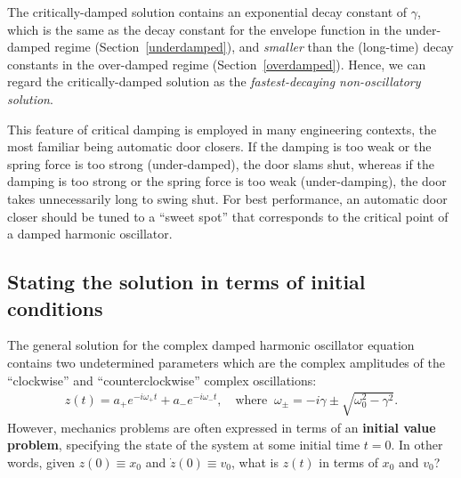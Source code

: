 \documentclass[10pt,a4paper]{article}
\begin{document}
The critically-damped solution contains an exponential decay constant
of $\gamma$, which is the same as the decay constant for the envelope
function in the under-damped regime (Section~\ref{underdamped}), and
\textit{smaller} than the (long-time) decay constants in the
over-damped regime (Section~\ref{overdamped}).  Hence, we can regard
the critically-damped solution as the \textit{fastest-decaying
  non-oscillatory solution}.

This feature of critical damping is employed in many engineering
contexts, the most familiar being automatic door closers. If the
damping is too weak or the spring force is too strong (under-damped),
the door slams shut, whereas if the damping is too strong or the
spring force is too weak (under-damping), the door takes unnecessarily
long to swing shut. For best performance, an automatic door closer
should be tuned to a ``sweet spot'' that corresponds to the critical
point of a damped harmonic oscillator.

\subsection{Stating the solution in terms of initial conditions}
\label{stating-the-solution-in-terms-of-initial-conditions}

The general solution for the complex damped harmonic oscillator
equation contains two undetermined parameters which are the complex
amplitudes of the ``clockwise'' and ``counterclockwise'' complex
oscillations:
\begin{align}
  z(t) = a_+ e^{-i\omega_+ t} + a_- e^{-i\omega_- t}, \quad\mathrm{where} \;\; \omega_\pm =  -i\gamma  \pm \sqrt{\omega_0^2 - \gamma^2}.
\end{align}
However, mechanics problems are often expressed in terms of an
\textbf{initial value problem}, specifying the state of the system at
some initial time $t = 0$. In other words, given $z(0) \equiv x_0$ and
$\dot{z}(0) \equiv v_0$, what is $z(t)$ in terms of $x_0$ and $v_0$?
\end{document}
